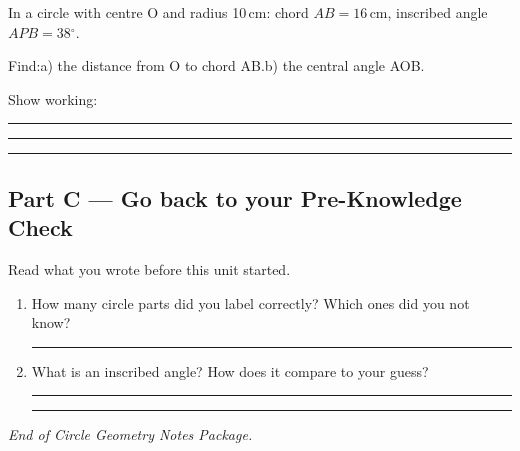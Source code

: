 \documentclass[11pt, a4paper]{article}
\newcommand{\dgr}{\ensuremath{^\circ}}
\newcommand{\answerline}{\par\vspace{0.45cm}\noindent\rule{\linewidth}{0.4pt}\par\vspace{0.1cm}}
\begin{document}
In a circle with centre O and radius 10\,cm: chord $AB = 16$\,cm, inscribed angle $APB = 38\dgr{}$.

Find:\quad a) the distance from O to chord AB.\quad b) the central angle AOB.

Show working:
\answerline\answerline\answerline

\subsection*{Part C --- Go back to your Pre-Knowledge Check}

Read what you wrote before this unit started.

\begin{enumerate}[leftmargin=*, itemsep=10pt]
  \item How many circle parts did you label correctly? Which ones did you not know? \answerline
  \item What is an inscribed angle? How does it compare to your guess? \answerline\answerline
\end{enumerate}

\vfill
\begin{center}
  \color{slatelight}\textit{End of Circle Geometry Notes Package.}
\end{center}
\end{document}
